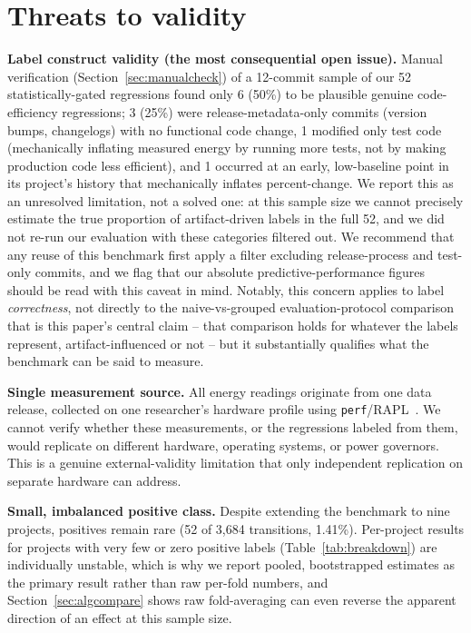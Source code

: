\documentclass[preprint,12pt]{elsarticle}
\begin{document}
\section{Threats to validity}
\label{sec:threats}

\textbf{Label construct validity (the most consequential open issue).} Manual verification (Section~\ref{sec:manualcheck}) of a 12-commit sample of our 52 statistically-gated regressions found only 6 (50\%) to be plausible genuine code-efficiency regressions; 3 (25\%) were release-metadata-only commits (version bumps, changelogs) with no functional code change, 1 modified only test code (mechanically inflating measured energy by running more tests, not by making production code less efficient), and 1 occurred at an early, low-baseline point in its project's history that mechanically inflates percent-change. We report this as an unresolved limitation, not a solved one: at this sample size we cannot precisely estimate the true proportion of artifact-driven labels in the full 52, and we did not re-run our evaluation with these categories filtered out. We recommend that any reuse of this benchmark first apply a filter excluding release-process and test-only commits, and we flag that our absolute predictive-performance figures should be read with this caveat in mind. Notably, this concern applies to label \emph{correctness}, not directly to the naive-vs-grouped evaluation-protocol comparison that is this paper's central claim -- that comparison holds for whatever the labels represent, artifact-influenced or not -- but it substantially qualifies what the benchmark can be said to measure.

\textbf{Single measurement source.} All energy readings originate from one data release, collected on one researcher's hardware profile using \texttt{perf}/RAPL~\citep{bechet2026energytrackr}. We cannot verify whether these measurements, or the regressions labeled from them, would replicate on different hardware, operating systems, or power governors. This is a genuine external-validity limitation that only independent replication on separate hardware can address.

\textbf{Small, imbalanced positive class.} Despite extending the benchmark to nine projects, positives remain rare (52 of 3{,}684 transitions, 1.41\%). Per-project results for projects with very few or zero positive labels (Table~\ref{tab:breakdown}) are individually unstable, which is why we report pooled, bootstrapped estimates as the primary result rather than raw per-fold numbers, and Section~\ref{sec:algcompare} shows raw fold-averaging can even reverse the apparent direction of an effect at this sample size.
\end{document}
